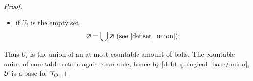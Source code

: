 \begin{proof}
\begin{itemize}
    \item if $U_i$ is the empty set,
    \begin{align*}
      \varnothing = \bigcup \varnothing \text{ (see \cref{def:set_union})}.
    \end{align*}
  \end{itemize}

  Thus $U_i$ is the union of an at most countable amount of balls. The countable union of countable sets is again countable, hence by \cref{def:topological_base/union}, $\mathcal B$ is a base for $\mathcal T_O$.
\end{proof}
